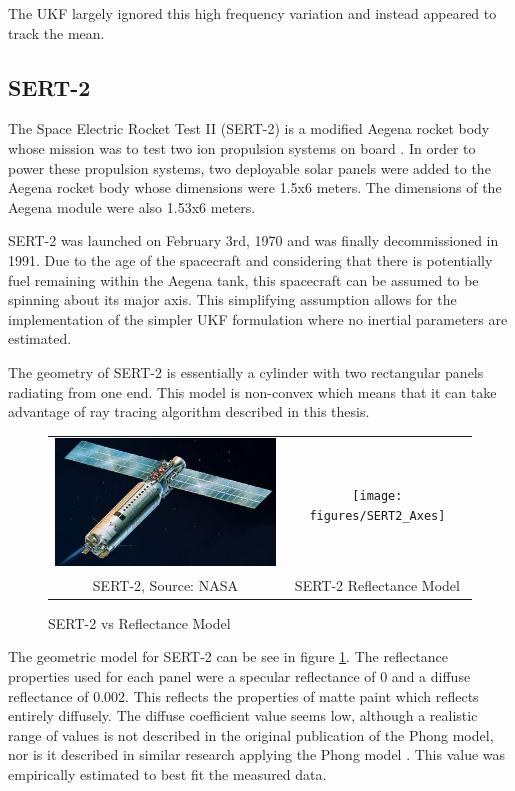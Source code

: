 The UKF largely ignored this high frequency variation and instead appeared to track the mean.

\subsection{SERT-2}

The Space Electric Rocket Test II (SERT-2) is a modified Aegena rocket body whose mission was to test two ion propulsion systems on board \cite{sert2}. In order to power these propulsion systems, two deployable solar panels were added to the Aegena rocket body whose dimensions were 1.5x6 meters. The dimensions of the Aegena module were also 1.53x6 meters.

SERT-2 was launched on February 3rd, 1970 and was finally decommissioned in 1991. Due to the age of the spacecraft and considering that there is potentially fuel remaining within the Aegena tank, this spacecraft can be assumed to be spinning about its major axis. This simplifying assumption allows for the implementation of the simpler UKF formulation where no inertial parameters are estimated.

The geometry of SERT-2 is essentially a cylinder with two rectangular panels radiating from one end. This model is non-convex which means that it can take advantage of ray tracing algorithm described in this thesis. 

\begin{figure}
	\begin{tabular}{cc}
	\includegraphics[width = 80mm]{figures/sert-2} & \texttt{[image: figures/SERT2\_Axes]} \\
	SERT-2, Source: NASA & SERT-2 Reflectance Model 
	
	\end{tabular}
	\caption{SERT-2 vs Reflectance Model}
	\label{sert_model}
\end{figure}

The geometric model for SERT-2 can be see in figure \ref{sert_model}. The reflectance properties used for each panel were a specular reflectance of 0 and a diffuse reflectance of 0.002. This reflects the properties of matte paint which reflects entirely diffusely. The diffuse coefficient value seems low, although a realistic range of values is not described in the original publication of the Phong model, nor is it described in similar research applying the Phong model \cite{phong_brdf} \cite{SpaceObjectCharacterization} \cite{StateAndParameter} \cite{Kaasalainen_LCI}. This value was empirically estimated to best fit the measured data.

